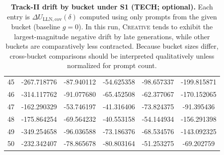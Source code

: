 \documentclass{article}
\theoremstyle{plain}
\theoremstyle{definition}
\theoremstyle{remark}
\begin{document}
\begin{table}[ht!]
\begin{tabular}{rccccc}
45 & -267.718776 & -87.940112 & -54.625358 & -98.657337 & -199.815871 \\
46 & -314.117762 & -91.077680 & -65.452508 & -62.377067 & -170.152065 \\
47 & -162.290329 & -53.746197 & -41.316406 & -73.824375 & -91.395436 \\
48 & -175.864254 & -69.564232 & -40.553158 & -54.144934 & -156.291398 \\
49 & -349.254658 & -96.036588 & -73.186376 & -68.534576 & -143.092325 \\
50 & -232.342407 & -78.865678 & -80.803164 & -51.253275 & -69.202759 \\
\bottomrule
\end{tabular}
\caption{
\textbf{Track-II drift by bucket under S1 (TECH; optional).}
Each entry is $\Delta U_{\mathrm{LLN,cov}}(\delta)$ computed using only prompts from the given bucket (baseline $g=0$).
In this run, \textsc{Creative} tends to exhibit the largest-magnitude negative drift by late generations, while other buckets are comparatively less contracted.
Because bucket sizes differ, cross-bucket comparisons should be interpreted qualitatively unless normalized for prompt count.
}
\label{tab:tech_bucket_trackII}
\end{table}
\end{document}
